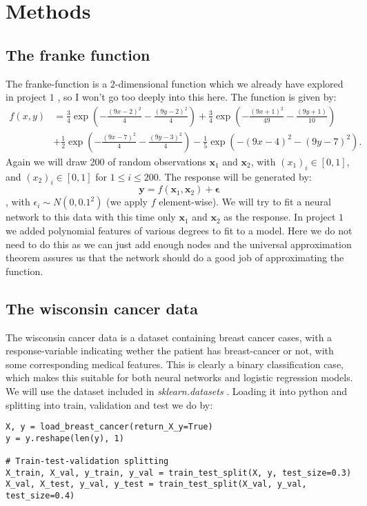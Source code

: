\documentclass{article}
\begin{document}
\section{Methods}
\subsection{The franke function}
The franke-function is a $2$-dimensional function which we already have explored
in project $1$ \cite{githubrepoproject1}, so I won't go too deeply into this
here. The function is given by:
\begin{align*}
      f(x,y) & = \frac{3}{4}\exp{\left(-\frac{(9x-2)^2}{4} - \frac{(9y-2)^2}{4}\right)}+\frac{3}{4}\exp{\left(-\frac{(9x+1)^2}{49}- \frac{(9y+1)}{10}\right)} \\
             & +\frac{1}{2}\exp{\left(-\frac{(9x-7)^2}{4} - \frac{(9y-3)^2}{4}\right)} -\frac{1}{5}\exp{\left(-(9x-4)^2 - (9y-7)^2\right) }.
\end{align*}
Again we will draw 200 of random observations $\bm{x}_1$ and $\bm{x}_2$, with
$(x_1)_i \in [0, 1]$, and $(x_2)_i \in [0, 1]$ for $1 \leq i \leq 200$. The response will be generated by:
$$\bm{y} = f(\bm{x}_1, \bm{x}_2) + \bm{\epsilon}$$
, with $\epsilon_i \sim N(0, 0.1^2)$ (we apply $f$ element-wise). We will try to
fit a neural network to this data with this time only $\bm{x}_1$ and $\bm{x}_2$
as the response. In project $1$ we added polynomial features of various degrees
to fit to a model. Here we do not need to do this as we can just add enough
nodes and the universal approximation theorem assures us that the network should
do a good job of approximating the function.

\subsection{The wisconsin cancer data}
The wisconsin cancer data \cite{breastcancerwisconsin} is a dataset containing
breast cancer cases, with a response-variable indicating wether the patient has
breast-cancer or not, with some corresponding medical features. This is clearly
a binary classification case, which makes this suitable for both neural networks
and logistic regression models. We will use the dataset included in
\textit{sklearn.datasets} \cite{sklearncancerdata}. Loading it into python and
splitting into train, validation and test we do by:

\begin{lstlisting}
X, y = load_breast_cancer(return_X_y=True)
y = y.reshape(len(y), 1)

# Train-test-validation splitting
X_train, X_val, y_train, y_val = train_test_split(X, y, test_size=0.3)
X_val, X_test, y_val, y_test = train_test_split(X_val, y_val, test_size=0.4)
\end{lstlisting}
\end{document}
